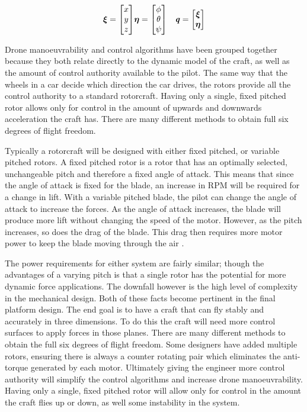 \documentclass[a4paper, 10pt, conference]{ieeeconf}
\begin{document}
\begin{eqnarray}
\boldsymbol{\xi}= 
\begin{bmatrix}
x\\
y\\
z
\end{bmatrix}&
\boldsymbol{\eta} = 
\begin{bmatrix}
\phi\\
\theta\\
\psi
\end{bmatrix}& 
\textbf{\textit{q}} = 
\begin{bmatrix}
\boldsymbol{\xi}\\
\boldsymbol{\eta}
\end{bmatrix}
\label{EQ_InertiaFrame}
\end{eqnarray}

Drone manoeuvrability and control algorithms have been grouped together because they both relate directly to the dynamic model of the craft, as well as the amount of control authority available to the pilot. The same way that the wheels in a car decide which direction the car drives, the rotors provide all the control authority to a standard rotorcraft. Having only a single, fixed pitched rotor allows only for control in the amount of upwards and downwards acceleration the craft has. There are many different methods to obtain full six degrees of flight freedom. 

Typically a rotorcraft will be designed with either fixed pitched, or variable pitched rotors. A fixed pitched rotor is a rotor that has an optimally selected, unchangeable pitch and therefore a fixed angle of attack. This means that since the angle of attack is fixed for the blade, an increase in RPM will be required for a change in lift. With a variable pitched blade, the pilot can change the angle of attack to increase the forces. As the angle of attack increases, the blade will produce more lift without changing the speed of the motor. However, as the pitch increases, so does the drag of the blade. This drag then requires more motor power to keep the blade moving through the air \cite{MiniFlying, Leishman}. 

The power requirements for either system are fairly similar; though the advantages of a varying pitch is that a single rotor has the potential for more dynamic force applications. The downfall however is the high level of complexity in the mechanical design. Both of these facts become pertinent in the final platform design. The end goal is to have a craft that can fly stably and accurately in three dimensions. To do this the craft will need more control surfaces to apply forces in those planes. There are many different methods to obtain the full six degrees of flight freedom. Some designers have added multiple rotors, ensuring there is always a counter rotating pair which eliminates the anti-torque generated by each motor. Ultimately giving the engineer more control authority will simplify the control algorithms and increase drone manoeuvrability. Having only a single, fixed pitched rotor will allow only for control in the amount the craft flies up or down, as well some instability in the system. 
\end{document}
